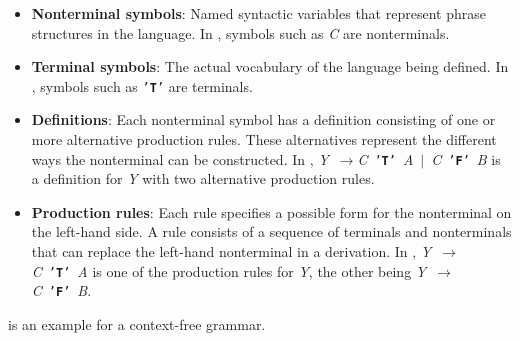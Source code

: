 \documentclass[conference,anonymous,review]{IEEEtran}
\def\term#1{\texttt{'\textbf{#1}'}}
\def\nonterm#1{\textlangle\textnormal{\emph{#1}}\textrangle}
\def\expandsto{\(\rightarrow{}\)}
\begin{document}
\begin{itemize}
    \item \textbf{Nonterminal symbols}: Named syntactic variables that represent phrase structures in the language. In , symbols such as \nonterm{C} are nonterminals.
    \item \textbf{Terminal symbols}: The actual vocabulary of the language being defined. In , symbols such as \term{T} are terminals.
    \item \textbf{Definitions}: Each nonterminal symbol has a definition consisting of one or more alternative production rules. These alternatives represent the different ways the nonterminal can be constructed. In , 
    \mbox{\nonterm{Y} \expandsto \nonterm{C} \term{T} \nonterm{A} $|$ \nonterm{C} \term{F} \nonterm{B}}
    is a definition for \nonterm{Y} with two alternative production rules. 
    \item \textbf{Production rules}: Each rule specifies a possible form for the nonterminal on the left-hand side. A rule consists of a sequence of terminals and nonterminals that can replace the left-hand nonterminal in a derivation.
    In , 
    \mbox{\nonterm{Y} \expandsto \nonterm{C} \term{T} \nonterm{A}} is one of the production rules for \nonterm{Y}, the other being \mbox{\nonterm{Y} \expandsto \nonterm{C} \term{F} \nonterm{B}}.
\end{itemize}
 is an example for a context-free grammar.
\end{document}
